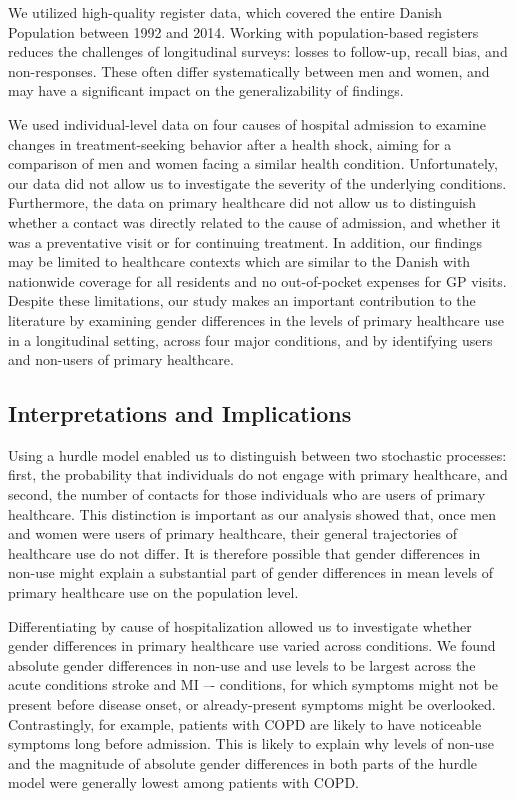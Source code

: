 We utilized high-quality register data, which covered the entire Danish 
Population between 1992 and 2014. Working with population-based registers 
reduces the challenges of longitudinal surveys: losses to follow-up, recall 
bias, and non-responses. These often differ systematically between men and 
women, and may have a significant impact on the generalizability of 
findings.\citep{hunt2011women,oliver2005help}

We used individual-level data on four causes of hospital admission to 
examine changes in treatment-seeking behavior after a health shock, 
aiming for a comparison of men and women facing a similar health condition. 
Unfortunately, our data did not allow us to investigate the severity of 
the underlying conditions. Furthermore, the data on primary healthcare 
did not allow us to distinguish whether a contact was directly related 
to the cause of admission, and whether it was a preventative visit or 
for continuing treatment. In addition, our findings may be limited to 
healthcare contexts which are similar to the Danish with nationwide 
coverage for all residents and no out-of-pocket expenses for GP visits. 
Despite these limitations, our study makes an important contribution 
to the literature by examining gender differences in the levels of 
primary healthcare use in a longitudinal setting, across four major 
conditions, and by identifying users and non-users of primary 
healthcare.\\

\subsection{Interpretations and Implications}

Using a hurdle model enabled us to distinguish between two stochastic 
processes: first, the probability that individuals do not engage with 
primary healthcare, and second, the number of contacts for those individuals 
who are users of primary healthcare. This distinction is important 
as our analysis showed that, once men and women were users of primary 
healthcare, their general trajectories of healthcare use do not differ. 
It is therefore possible that gender differences in non-use might 
explain a substantial part of gender differences in mean levels of 
primary healthcare use on the population level.

Differentiating by cause of hospitalization allowed us to investigate 
whether gender differences in primary healthcare use varied across 
conditions. We found absolute gender differences in non-use and use 
levels to be largest across the acute conditions stroke and MI –-
conditions, for which symptoms might not be present before disease 
onset, or already-present symptoms might be overlooked. Contrastingly, 
for example, patients with COPD are likely to have noticeable symptoms 
long before admission. This is likely to explain why levels of non-use 
and the magnitude of absolute gender differences in both parts of the 
hurdle model were generally lowest among patients with COPD.

